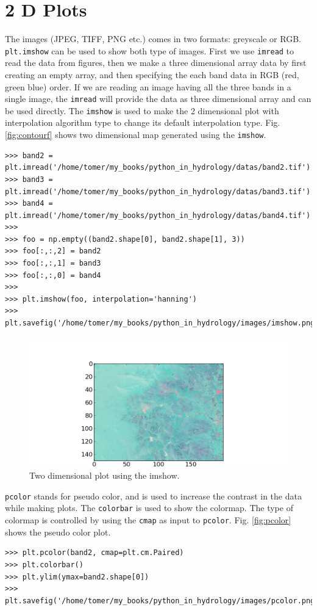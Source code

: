 \documentclass[10pt]{book}
\begin{document}
\section{2 D Plots}
The images (JPEG, TIFF, PNG etc.) comes in two formats: greyscale or RGB. \verb"plt.imshow" can be used to show both type of images. First we use \verb"imread" to read the data from figures, then we make a three dimensional array data by first creating an empty array, and then specifying the each band data in RGB (red, green blue) order. If we are reading an image having all the three bands in a single image, the \verb"imread" will provide the data as three dimensional array and can be used directly. The \verb"imshow" is used to make the 2 dimensional plot with interpolation algorithm type to change its default interpolation type. Fig. \ref{fig:contourf} shows two dimensional map generated using the \verb"imshow". 
\beforeverb
\begin{verbatim}
>>> band2 = plt.imread('/home/tomer/my_books/python_in_hydrology/datas/band2.tif')
>>> band3 = plt.imread('/home/tomer/my_books/python_in_hydrology/datas/band3.tif')
>>> band4 = plt.imread('/home/tomer/my_books/python_in_hydrology/datas/band4.tif')
>>> 
>>> foo = np.empty((band2.shape[0], band2.shape[1], 3))
>>> foo[:,:,2] = band2
>>> foo[:,:,1] = band3
>>> foo[:,:,0] = band4
>>> 
>>> plt.imshow(foo, interpolation='hanning')
>>> plt.savefig('/home/tomer/my_books/python_in_hydrology/images/imshow.png')
\end{verbatim}
\afterverb
{}

\beforefig
\begin{figure}[h!]
  \centering
    \includegraphics[scale=0.5]{images/imshow.png}
  \caption{Two dimensional plot using the imshow.}
   \label{fig:imshow}
\end{figure}
\afterfig

\verb"pcolor" stands for pseudo color, and is used to increase the contrast in the data while making plots. The \verb"colorbar" is used to show the colormap. The type of colormap is controlled by using the \verb"cmap" as input to \verb"pcolor". Fig. \ref{fig:pcolor} shows the pseudo color plot. 
\beforeverb \begin{verbatim}
>>> plt.pcolor(band2, cmap=plt.cm.Paired)
>>> plt.colorbar()
>>> plt.ylim(ymax=band2.shape[0])
>>> plt.savefig('/home/tomer/my_books/python_in_hydrology/images/pcolor.png')
\end{verbatim} \afterverb
{}
\end{document}
